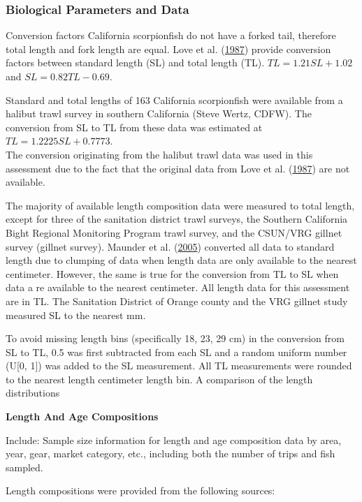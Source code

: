 \documentclass[12pt,]{article}
\begin{document}
\subsubsection{Biological Parameters and
Data}\label{biological-parameters-and-data}

Conversion factors California scorpionfish do not have a forked tail,
therefore total length and fork length are equal. Love et al.
(\protect\hyperlink{ref-Love1987}{1987}) provide conversion factors
between standard length (SL) and total length (TL).
\(TL = 1.21SL + 1.02\) and \(SL = 0.82TL - 0.69\).

Standard and total lengths of 163 California scorpionfish were available
from a halibut trawl survey in southern California (Steve Wertz, CDFW).
The conversion from SL to TL from these data was estimated at
\(TL = 1.2225SL + 0.7773\).\\
The conversion originating from the halibut trawl data was used in this
assessment due to the fact that the original data from Love et al.
(\protect\hyperlink{ref-Love1987}{1987}) are not available.

The majority of available length composition data were measured to total
length, except for three of the sanitation district trawl surveys, the
Southern California Bight Regional Monitoring Program trawl survey, and
the CSUN/VRG gillnet survey (gillnet survey). Maunder et al.
(\protect\hyperlink{ref-Maunder2005}{2005}) converted all data to
standard length due to clumping of data when length data are only
available to the nearest centimeter. However, the same is true for the
conversion from TL to SL when data a re available to the nearest
centimeter. All length data for this assessment are in TL. The
Sanitation District of Orange county and the VRG gillnet study measured
SL to the nearest mm.

To avoid missing length bins (specifically 18, 23, 29 cm) in the
conversion from SL to TL, 0.5 was first subtracted from each SL and a
random uniform number (U{[}0, 1{]}) was added to the SL measurement. All
TL measurements were rounded to the nearest length centimeter length
bin. A comparison of the length distributions

\textbf{Length And Age Compositions}

Include: Sample size information for length and age composition data by
area, year, gear, market category, etc., including both the number of
trips and fish sampled.

Length compositions were provided from the following sources:
\end{document}
